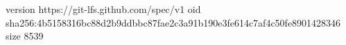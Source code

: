 version https://git-lfs.github.com/spec/v1
oid sha256:4b5158316bc88d2b9ddbbc87fae2c3a91b190e3fe614c7af4c50fe8901428346
size 8539
